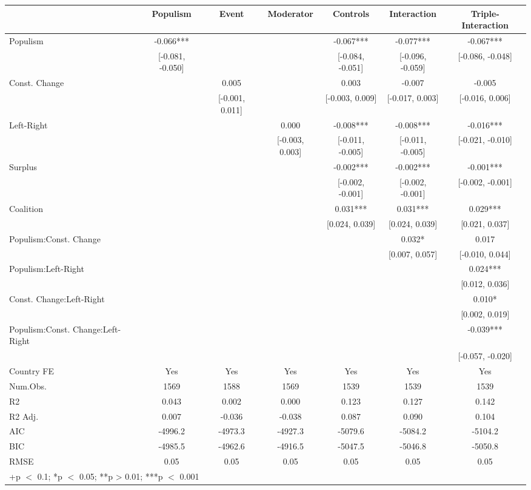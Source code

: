 \begin{table}
\centering\centering\centering
\begin{tabular}[t]{lcccccc}
\toprule
  & Populism & Event & Moderator & Controls & Interaction & Triple-Interaction\\
\midrule
Populism & -0.066*** &  &  & -0.067*** & -0.077*** & -0.067***\\
 & {}[-0.081, -0.050] &  &  & {}[-0.084, -0.051] & {}[-0.096, -0.059] & {}[-0.086, -0.048]\\
Const. Change &  & 0.005 &  & 0.003 & -0.007 & -0.005\\
 &  & {}[-0.001, 0.011] &  & {}[-0.003, 0.009] & {}[-0.017, 0.003] & {}[-0.016, 0.006]\\
Left-Right &  &  & 0.000 & -0.008*** & -0.008*** & -0.016***\\
 &  &  & {}[-0.003, 0.003] & {}[-0.011, -0.005] & {}[-0.011, -0.005] & {}[-0.021, -0.010]\\
Surplus &  &  &  & -0.002*** & -0.002*** & -0.001***\\
 &  &  &  & {}[-0.002, -0.001] & {}[-0.002, -0.001] & {}[-0.002, -0.001]\\
Coalition &  &  &  & 0.031*** & 0.031*** & 0.029***\\
 &  &  &  & {}[0.024, 0.039] & {}[0.024, 0.039] & {}[0.021, 0.037]\\
Populism:Const. Change &  &  &  &  & 0.032* & 0.017\\
 &  &  &  &  & {}[0.007, 0.057] & {}[-0.010, 0.044]\\
Populism:Left-Right &  &  &  &  &  & 0.024***\\
 &  &  &  &  &  & {}[0.012, 0.036]\\
Const. Change:Left-Right &  &  &  &  &  & 0.010*\\
 &  &  &  &  &  & {}[0.002, 0.019]\\
Populism:Const. Change:Left-Right &  &  &  &  &  & -0.039***\\
 &  &  &  &  &  & {}[-0.057, -0.020]\\
\midrule
Country FE & Yes & Yes & Yes & Yes & Yes & Yes\\
Num.Obs. & 1569 & 1588 & 1569 & 1539 & 1539 & 1539\\
R2 & 0.043 & 0.002 & 0.000 & 0.123 & 0.127 & 0.142\\
R2 Adj. & 0.007 & -0.036 & -0.038 & 0.087 & 0.090 & 0.104\\
AIC & -4996.2 & -4973.3 & -4927.3 & -5079.6 & -5084.2 & -5104.2\\
BIC & -4985.5 & -4962.6 & -4916.5 & -5047.5 & -5046.8 & -5050.8\\
RMSE & 0.05 & 0.05 & 0.05 & 0.05 & 0.05 & 0.05\\
\bottomrule
\multicolumn{7}{l}{\rule{0pt}{1em}+p $<$ 0.1; *p $<$ 0.05; **p > 0.01; ***p $<$ 0.001}\\
\end{tabular}
\end{table}
